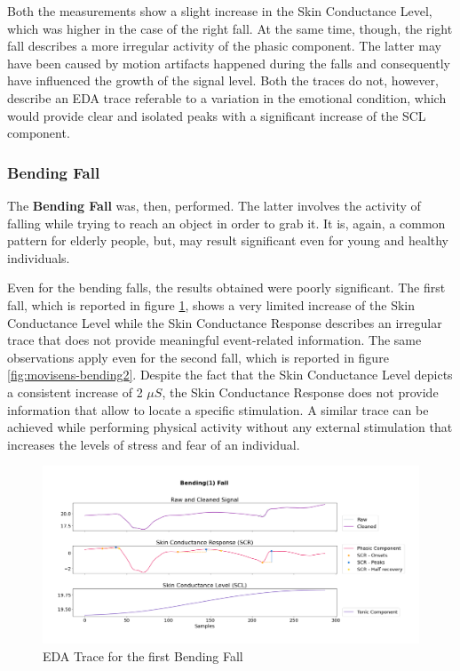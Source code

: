 Both the measurements show a slight increase in the Skin Conductance Level, which was higher in the case of the right fall. At the same time, though, the right fall describes a more irregular activity of the phasic component. The latter may have been caused by motion artifacts happened during the falls and consequently have influenced the growth of the signal level. Both the traces do not, however, describe an EDA trace referable to a variation in the emotional condition, which would provide clear and isolated peaks with a significant increase of the SCL component.

\subsubsection{Bending Fall}\label{subsubsec:bending-fall}

The \textbf{Bending Fall} was, then, performed. The latter involves the activity of falling while trying to reach an object in order to grab it. It is, again, a common pattern for elderly people, but, may result significant even for young and healthy individuals.


Even for the bending falls, the results obtained were poorly significant. The first fall, which is reported in figure \ref{fig:movisens-bending1}, shows a very limited increase of the Skin Conductance Level while the Skin Conductance Response describes an irregular trace that does not provide meaningful event-related information. The same observations apply even for the second fall, which is reported in figure \ref{fig:movisens-bending2}. Despite the fact that the Skin Conductance Level depicts a consistent increase of 2 $\mu S$, the Skin Conductance Response does not provide information that allow to locate a specific stimulation. A similar trace can be achieved while performing physical activity without any external stimulation that increases the levels of stress and fear of an individual.

\begin{figure}[H]
    \centering
    \includegraphics[width=\textwidth]{./images/movisens/Bending1.png}
    \caption{EDA Trace for the first Bending Fall}
    \label{fig:movisens-bending1}
\end{figure}

